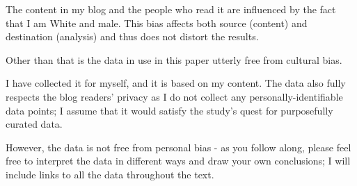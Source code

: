 The content in my blog and the people who read it are influenced by the fact that I am White and male. This bias affects both source (content) and destination (analysis) and thus does not distort the results.

Other than that is the data in use in this paper utterly free from cultural bias. 

I have collected it for myself, and it is based on my content. The data also fully respects the blog readers' privacy as I do not collect any personally-identifiable data points; I assume that it would satisfy the study's quest for purposefully curated data.

However, the data is not free from personal bias - as you follow along, please feel free to interpret the data in different ways and draw your own conclusions; I will include links to all the data throughout the text.
